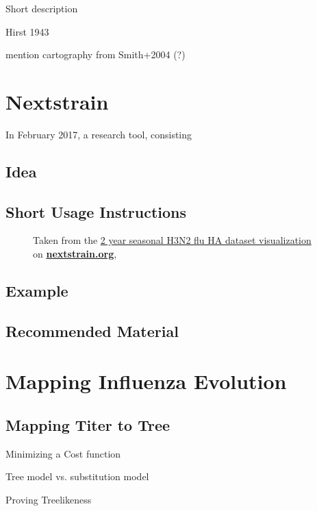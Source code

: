 \documentclass[12pt]{scrartcl}
\begin{document}
    Short description

    Hirst 1943

    mention cartography from Smith+2004 (?) 

\section{Nextstrain} \label{nextstrain}

  In February 2017, a research tool, consisting

  \subsection{Idea}

  \subsection{Short Usage Instructions}
  \begin{figure}[h!]
    \caption{\footnotesize Taken from the \href{https://nextstrain.org/flu/seasonal/h3n2/ha/2y?p=grid}{2 year seasonal H3N2 flu HA dataset visualization} on \href{https://nextstrain.org}{\textbf{nextstrain.org}}, \cite{leeMoncla+20}}
  \end{figure}


  \subsection{Example}

  \subsection{Recommended Material}

\section{Mapping Influenza Evolution}

  \subsection{Mapping Titer to Tree}

    Minimizing a Cost function

    Tree model vs. substitution model

    Proving Treelikeness
\end{document}
